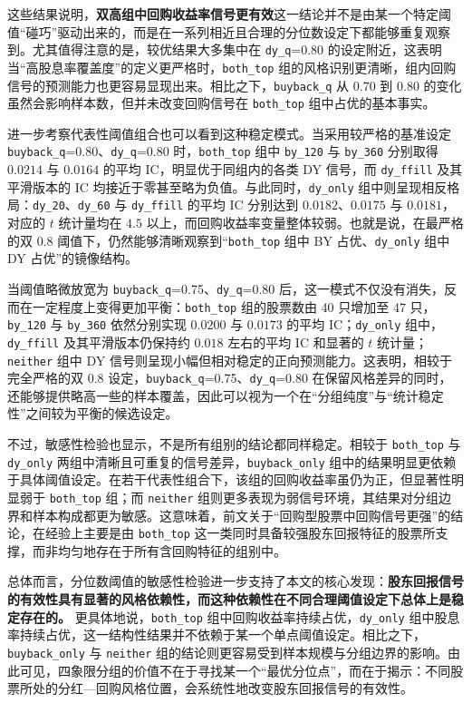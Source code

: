\documentclass[a4paper,10pt]{article}
\begin{document}
这些结果说明，\textbf{双高组中回购收益率信号更有效}这一结论并不是由某一个特定阈值“碰巧”驱动出来的，而是在一系列相近且合理的分位数设定下都能够重复观察到。尤其值得注意的是，较优结果大多集中在 \texttt{dy\_q}=0.80 的设定附近，这表明当“高股息率覆盖度”的定义更严格时，\texttt{both\_top} 组的风格识别更清晰，组内回购信号的预测能力也更容易显现出来。相比之下，\texttt{buyback\_q} 从 $0.70$ 到 $0.80$ 的变化虽然会影响样本数，但并未改变回购信号在 \texttt{both\_top} 组中占优的基本事实。

进一步考察代表性阈值组合也可以看到这种稳定模式。当采用较严格的基准设定 \texttt{buyback\_q}=0.80、\texttt{dy\_q}=0.80 时，\texttt{both\_top} 组中 \texttt{by\_120} 与 \texttt{by\_360} 分别取得 $0.0214$ 与 $0.0164$ 的平均 IC，明显优于同组内的各类 DY 信号，而 \texttt{dy\_ffill} 及其平滑版本的 IC 均接近于零甚至略为负值。与此同时，\texttt{dy\_only} 组中则呈现相反格局：\texttt{dy\_20}、\texttt{dy\_60} 与 \texttt{dy\_ffill} 的平均 IC 分别达到 $0.0182$、$0.0175$ 与 $0.0181$，对应的 $t$ 统计量均在 $4.5$ 以上，而回购收益率变量整体较弱。也就是说，在最严格的双 $0.8$ 阈值下，仍然能够清晰观察到“\texttt{both\_top} 组中 BY 占优、\texttt{dy\_only} 组中 DY 占优”的镜像结构。

当阈值略微放宽为 \texttt{buyback\_q}=0.75、\texttt{dy\_q}=0.80 后，这一模式不仅没有消失，反而在一定程度上变得更加平衡：\texttt{both\_top} 组的股票数由 $40$ 只增加至 $47$ 只，\texttt{by\_120} 与 \texttt{by\_360} 依然分别实现 $0.0200$ 与 $0.0173$ 的平均 IC；\texttt{dy\_only} 组中，\texttt{dy\_ffill} 及其平滑版本仍保持约 $0.018$ 左右的平均 IC 和显著的 $t$ 统计量；\texttt{neither} 组中 DY 信号则呈现小幅但相对稳定的正向预测能力。这表明，相较于完全严格的双 $0.8$ 设定，\texttt{buyback\_q}=0.75、\texttt{dy\_q}=0.80 在保留风格差异的同时，还能够提供略高一些的样本覆盖，因此可以视为一个在“分组纯度”与“统计稳定性”之间较为平衡的候选设定。

不过，敏感性检验也显示，不是所有组别的结论都同样稳定。相较于 \texttt{both\_top} 与 \texttt{dy\_only} 两组中清晰且可重复的信号差异，\texttt{buyback\_only} 组中的结果明显更依赖于具体阈值设定。在若干代表性组合下，该组的回购收益率虽仍为正，但显著性明显弱于 \texttt{both\_top} 组；而 \texttt{neither} 组则更多表现为弱信号环境，其结果对分组边界和样本构成都更为敏感。这意味着，前文关于“回购型股票中回购信号更强”的结论，在经验上主要是由 \texttt{both\_top} 这一类同时具备较强股东回报特征的股票所支撑，而非均匀地存在于所有含回购特征的组别中。

总体而言，分位数阈值的敏感性检验进一步支持了本文的核心发现：\textbf{股东回报信号的有效性具有显著的风格依赖性，而这种依赖性在不同合理阈值设定下总体上是稳定存在的。} 更具体地说，\texttt{both\_top} 组中回购收益率持续占优，\texttt{dy\_only} 组中股息率持续占优，这一结构性结果并不依赖于某一个单点阈值设定。相比之下，\texttt{buyback\_only} 与 \texttt{neither} 组的结论则更容易受到样本规模与分组边界的影响。由此可见，四象限分组的价值不在于寻找某一个“最优分位点”，而在于揭示：不同股票所处的分红—回购风格位置，会系统性地改变股东回报信号的有效性。
\end{document}

